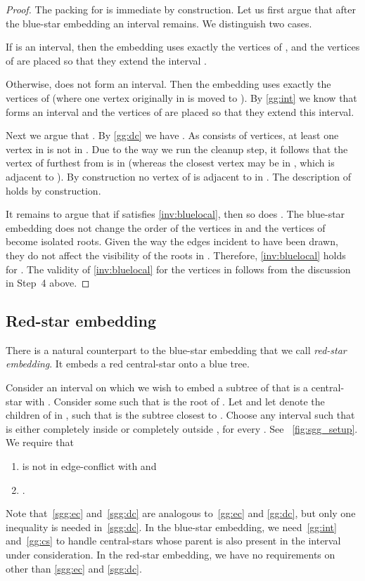 \documentclass[11pt,a4paper,colorlinks=true,urlcolor=blue,citecolor=red]{article}
\theoremstyle{plain}
\begin{document}
\begin{proof}
  The packing for  is immediate by construction. Let us first argue
  that after the blue-star embedding an interval 
  remains. We distinguish two cases.

  If  is an interval, then the embedding
  uses exactly the vertices of , and
  the vertices of  are placed so that they extend the interval
  .

  Otherwise,  does not form an
  interval. Then the embedding uses exactly the vertices of
   (where one vertex originally in
   is moved to ). By \ref{gg:int} we know that
   forms an interval and the vertices of
   are placed so that they extend this interval.

  Next we argue that . By \ref{gg:dc}
  we have . As  consists of
   vertices, at least one vertex in  is not in
  . Due to the way we run the cleanup step, it follows that the
  vertex of  furthest from  is in 
  (whereas the closest vertex may be in , which is adjacent to
  ). By construction no vertex of  is adjacent
  to  in . The description of  holds by
  construction.

  It remains to argue that if  satisfies \ref{inv:bluelocal}, then so
  does . The blue-star embedding does not change the order
  of the vertices in  and the vertices of 
  become isolated roots. Given the way the edges incident to 
  have been drawn, they do not affect the visibility of the roots in
  .  Therefore, \ref{inv:bluelocal} holds for
  . The validity of \ref{inv:bluelocal} for the
  vertices in  follows from the discussion in Step~4 above.
\end{proof}

\subsection{Red-star embedding}
There is a natural counterpart to the blue-star embedding that we call
\emph{red-star embedding}. It embeds a red central-star onto a blue
tree.

Consider an interval  on which we wish to embed a subtree 
of  that is a central-star with . Consider some 
such that  is the root of .  Let
 and let  denote the children of
 in , such that  is the subtree closest to
.  Choose any interval  such
that  is either completely inside or completely outside
, for every . See
\figurename~\ref{fig:sgg_setup}. We require that
\begin{enumerate}[label={(RS\arabic*)}]\setlength{\itemindent}{3em}
\item\label{sgg:ec}  is not in edge-conflict with  and
\item\label{sgg:dc} .
\end{enumerate}
Note that~\ref{sgg:ec} and~\ref{sgg:dc} are analogous to~\ref{gg:ec} and
\ref{gg:dc}, but only one inequality is needed in~\ref{sgg:dc}. In the
blue-star embedding, we need~\ref{gg:int} and~\ref{gg:cs} to handle
central-stars whose parent is also present in the interval under
consideration. In the red-star embedding, we have no requirements on 
other than \ref{sgg:ec} and \ref{sgg:dc}.
\end{document}
